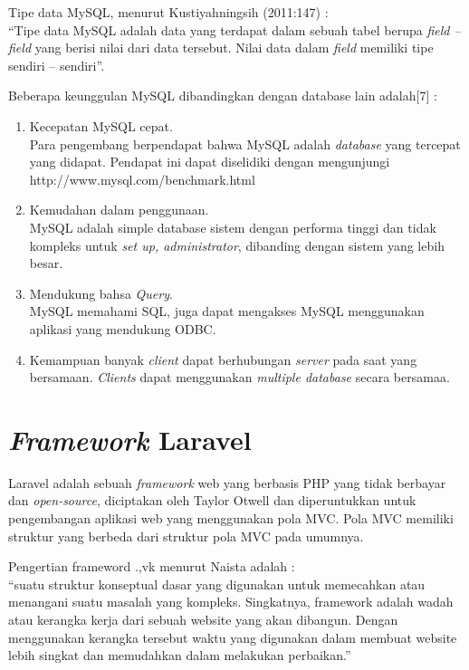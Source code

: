 Tipe data MySQL, menurut Kustiyahningsih (2011:147) : \\
“Tipe data MySQL adalah data yang terdapat dalam sebuah tabel berupa \textit{field – field} yang berisi nilai dari data tersebut. Nilai data dalam \textit{field} memiliki tipe sendiri – sendiri”.

Beberapa keunggulan MySQL dibandingkan dengan database lain adalah[7] :

\begin{enumerate}

\item Kecepatan MySQL cepat. \\
Para pengembang berpendapat bahwa MySQL adalah \textit{database} yang tercepat yang didapat. Pendapat ini dapat diselidiki dengan mengunjungi http://www.mysql.com/benchmark.html

\item Kemudahan dalam penggunaan. \\
MySQL adalah simple database sistem dengan performa tinggi dan tidak kompleks untuk \textit{set up, administrator}, dibanding dengan sistem yang lebih besar.

\item Mendukung bahsa \textit{Query}. \\
MySQL memahami SQL, juga dapat mengakses MySQL menggunakan aplikasi yang mendukung ODBC.

\item Kemampuan banyak \textit{client} dapat berhubungan \textit{server} pada saat yang bersamaan. \textit{Clients} dapat menggunakan \textit{multiple database} secara bersamaa. 

\end{enumerate} 

\section{\textit{Framework} Laravel}

Laravel adalah sebuah \textit{framework} web yang berbasis PHP yang tidak berbayar dan \textit{open-source}, diciptakan oleh Taylor Otwell dan diperuntukkan untuk pengembangan aplikasi web yang menggunakan pola MVC. Pola MVC memiliki struktur yang berbeda dari struktur pola MVC pada umumnya.

Pengertian frameword .,vk menurut Naista adalah : \\
“suatu struktur konseptual dasar yang digunakan untuk memecahkan atau menangani suatu masalah yang kompleks. Singkatnya, framework adalah wadah atau kerangka kerja dari sebuah website yang akan dibangun. Dengan menggunakan kerangka tersebut waktu yang digunakan dalam membuat website lebih singkat dan memudahkan dalam melakukan perbaikan.”

